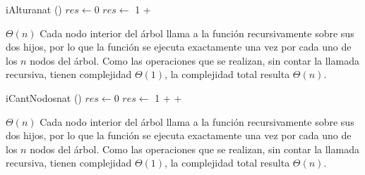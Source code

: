 \begin{Algoritmos}


  \begin{algoritmo}{iAltura}{}{nat}
    \eIf(){}{
      $res \gets 0$ 
    }{
      $res \gets$ 1 +  
    }
  \end{algoritmo}
  \datosAlgoritmo{} %
  {} %
  {} %
  {$\Theta(n)$} %
  {Cada nodo interior del \'arbol llama a la funci\'on recursivamente sobre sus dos hijos, por lo que la funci\'on se ejecuta exactamente una vez por cada uno de los $n$ nodos del \'arbol. Como las operaciones que se realizan, sin contar la llamada recursiva, tienen complejidad $\Theta(1)$, la complejidad total resulta $\Theta(n)$.} %

  \begin{algoritmo}{iCantNodos}{}{nat}
    \eIf(){}{
      $res \gets 0$ 
    }{
      $res \gets$ 1 +  +  
    }
  \end{algoritmo}
  \datosAlgoritmo{} %
  {} %
  {} %
  {$\Theta(n)$} %
  {Cada nodo interior del \'arbol llama a la funci\'on recursivamente sobre sus dos hijos, por lo que la funci\'on se ejecuta exactamente una vez por cada uno de los $n$ nodos del \'arbol. Como las operaciones que se realizan, sin contar la llamada recursiva, tienen complejidad $\Theta(1)$, la complejidad total resulta $\Theta(n)$.} %

\end{Algoritmos}